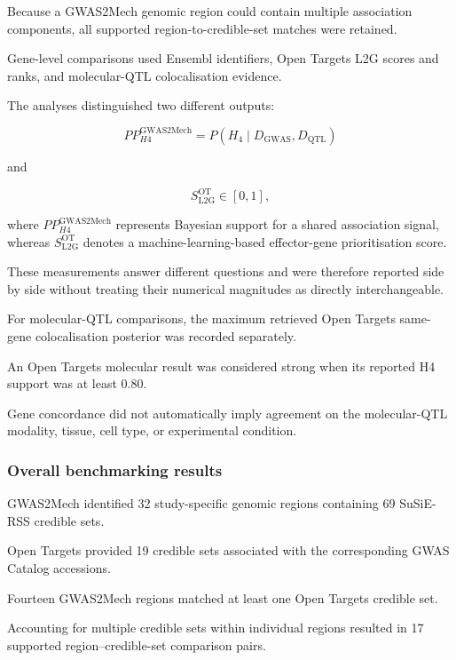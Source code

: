 \documentclass[11pt,a4paper]{article}
\begin{document}
Because a GWAS2Mech genomic region could contain
multiple association components, all supported
region-to-credible-set matches were retained.

Gene-level comparisons used Ensembl identifiers,
Open Targets L2G scores and ranks, and molecular-QTL
colocalisation evidence.

The analyses distinguished two different outputs:

\begin{equation}
PP_{H4}^{\mathrm{GWAS2Mech}}
=
P(H_4 \mid D_{\mathrm{GWAS}},D_{\mathrm{QTL}})
\end{equation}

and

\begin{equation}
S_{\mathrm{L2G}}^{\mathrm{OT}}\in[0,1],
\end{equation}

where $PP_{H4}^{\mathrm{GWAS2Mech}}$ represents
Bayesian support for a shared association signal,
whereas $S_{\mathrm{L2G}}^{\mathrm{OT}}$ denotes
a machine-learning-based effector-gene
prioritisation score.

These measurements answer different questions
and were therefore reported side by side without
treating their numerical magnitudes as directly
interchangeable.

For molecular-QTL comparisons, the maximum retrieved
Open Targets same-gene colocalisation posterior
was recorded separately.

An Open Targets molecular result was considered
strong when its reported H4 support was at least 0.80.

Gene concordance did not automatically imply
agreement on the molecular-QTL modality, tissue,
cell type, or experimental condition.


\subsubsection{Overall benchmarking results}

GWAS2Mech identified 32 study-specific genomic
regions containing 69 SuSiE-RSS credible sets.

Open Targets provided 19 credible sets associated
with the corresponding GWAS Catalog accessions.

Fourteen GWAS2Mech regions matched at least one
Open Targets credible set.

Accounting for multiple credible sets within
individual regions resulted in 17 supported
region--credible-set comparison pairs.
\end{document}
